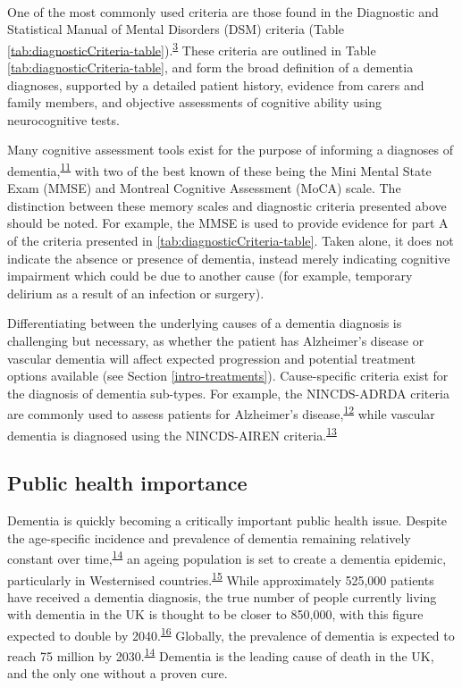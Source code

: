 \documentclass[a4paper, twoside]{templates/ociamthesis}
\begin{document}
~

One of the most commonly used criteria are those found in the Diagnostic and Statistical Manual of Mental Disorders (DSM) criteria (Table \ref{tab:diagnosticCriteria-table}).\textsuperscript{\protect\hyperlink{ref-edition2013}{3}} These criteria are outlined in Table \ref{tab:diagnosticCriteria-table}, and form the broad definition of a dementia diagnoses, supported by a detailed patient history, evidence from carers and family members, and objective assessments of cognitive ability using neurocognitive tests.

Many cognitive assessment tools exist for the purpose of informing a diagnoses of dementia,\textsuperscript{\protect\hyperlink{ref-sheehan2012}{11}} with two of the best known of these being the Mini Mental State Exam (MMSE) and Montreal Cognitive Assessment (MoCA) scale. The distinction between these memory scales and diagnostic criteria presented above should be noted. For example, the MMSE is used to provide evidence for part A of the criteria presented in \ref{tab:diagnosticCriteria-table}. Taken alone, it does not indicate the absence or presence of dementia, instead merely indicating cognitive impairment which could be due to another cause (for example, temporary delirium as a result of an infection or surgery).

Differentiating between the underlying causes of a dementia diagnosis is challenging but necessary, as whether the patient has Alzheimer's disease or vascular dementia will affect expected progression and potential treatment options available (see Section \ref{intro-treatments}). Cause-specific criteria exist for the diagnosis of dementia sub-types. For example, the NINCDS-ADRDA criteria are commonly used to assess patients for Alzheimer's disease,\textsuperscript{\protect\hyperlink{ref-dubois2007}{12}} while vascular dementia is diagnosed using the NINCDS-AIREN criteria.\textsuperscript{\protect\hyperlink{ref-roman1993}{13}}

\hypertarget{public-health-importance}{%
\subsection{Public health importance}\label{public-health-importance}}

Dementia is quickly becoming a critically important public health issue. Despite the age-specific incidence and prevalence of dementia remaining relatively constant over time,\textsuperscript{\protect\hyperlink{ref-prince2016}{14}} an ageing population is set to create a dementia epidemic, particularly in Westernised countries.\textsuperscript{\protect\hyperlink{ref-flier2005}{15}} While approximately 525,000 patients have received a dementia diagnosis, the true number of people currently living with dementia in the UK is thought to be closer to 850,000, with this figure expected to double by 2040.\textsuperscript{\protect\hyperlink{ref-baker2019}{16}} Globally, the prevalence of dementia is expected to reach 75 million by 2030.\textsuperscript{\protect\hyperlink{ref-prince2016}{14}} Dementia is the leading cause of death in the UK, and the only one without a proven cure.
\end{document}
